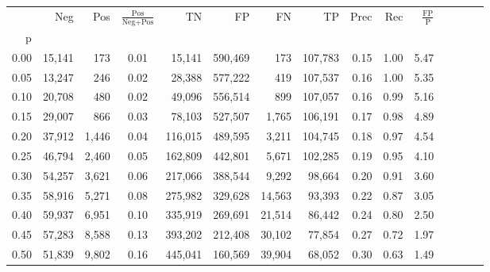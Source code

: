 \begin{tabular}{rrrcrrrrrrrrrrr}
\toprule
{} &     Neg &     Pos & $\frac{\text{Pos}}{\text{Neg}+\text{Pos}}$ &       TN &       FP &       FN &       TP &  Prec &   Rec & $\frac{\text{FP}}{\text{P}}$ \\
p    &         &         &                                            &          &          &          &          &       &       &                              \\
\midrule
0.00 &  15,141 &     173 &                                       0.01 &   15,141 &  590,469 &      173 &  107,783 &  0.15 &  1.00 &                         5.47 \\
0.05 &  13,247 &     246 &                                       0.02 &   28,388 &  577,222 &      419 &  107,537 &  0.16 &  1.00 &                         5.35 \\
0.10 &  20,708 &     480 &                                       0.02 &   49,096 &  556,514 &      899 &  107,057 &  0.16 &  0.99 &                         5.16 \\
0.15 &  29,007 &     866 &                                       0.03 &   78,103 &  527,507 &    1,765 &  106,191 &  0.17 &  0.98 &                         4.89 \\
0.20 &  37,912 &   1,446 &                                       0.04 &  116,015 &  489,595 &    3,211 &  104,745 &  0.18 &  0.97 &                         4.54 \\
0.25 &  46,794 &   2,460 &                                       0.05 &  162,809 &  442,801 &    5,671 &  102,285 &  0.19 &  0.95 &                         4.10 \\
0.30 &  54,257 &   3,621 &                                       0.06 &  217,066 &  388,544 &    9,292 &   98,664 &  0.20 &  0.91 &                         3.60 \\
0.35 &  58,916 &   5,271 &                                       0.08 &  275,982 &  329,628 &   14,563 &   93,393 &  0.22 &  0.87 &                         3.05 \\
0.40 &  59,937 &   6,951 &                                       0.10 &  335,919 &  269,691 &   21,514 &   86,442 &  0.24 &  0.80 &                         2.50 \\
0.45 &  57,283 &   8,588 &                                       0.13 &  393,202 &  212,408 &   30,102 &   77,854 &  0.27 &  0.72 &                         1.97 \\
0.50 &  51,839 &   9,802 &                                       0.16 &  445,041 &  160,569 &   39,904 &   68,052 &  0.30 &  0.63 &                         1.49 \\

\end{tabular}
